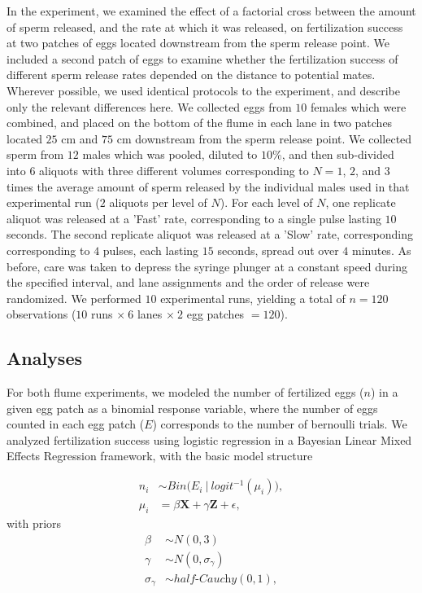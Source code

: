 \documentclass{article}
\begin{document}
	In the  experiment, we examined the effect of a factorial cross between the amount of sperm released, and the rate at which it was released, on fertilization success at two patches of eggs located downstream from the sperm release point. We included a second patch of eggs to examine whether the fertilization success of different sperm release rates depended on the distance to potential mates. Wherever possible, we used identical protocols to the  experiment, and describe only the relevant differences here. We collected eggs from $10$ females which were combined, and placed on the bottom of the flume in each lane in two patches located $25$ cm and $75$ cm downstream from the sperm release point. We collected sperm from $12$ males which was pooled, diluted to $10$\%, and then sub-divided into $6$ aliquots with three different volumes corresponding to $N = 1$, $2$, and $3$ times the average amount of sperm released by the individual males used in that experimental run ($2$ aliquots per level of $N$). For each level of $N$, one replicate aliquot was released at a 'Fast' rate, corresponding to a single pulse lasting $10$ seconds. The second replicate aliquot was released at a 'Slow' rate, corresponding corresponding to $4$ pulses, each lasting $15$ seconds, spread out over $4$ minutes. As before, care was taken to depress the syringe plunger at a constant speed during the specified interval, and lane assignments and the order of release were randomized. We performed $10$ experimental runs, yielding a total of $n=120$ observations ($10$ runs $\times~6$ lanes $\times~2$ egg patches $= 120$).

	\subsection*{Analyses}
	For both flume experiments, we modeled the number of fertilized eggs ($n$) in a given egg patch as a binomial response variable, where the number of eggs counted in each egg patch ($E$) corresponds to the number of bernoulli trials. We analyzed fertilization success using logistic regression in a Bayesian Linear Mixed Effects Regression framework, with the basic model structure 

\begin{align*}
	n_i   &\sim Bin\Big(E_i~|~logit^{-1}(\mu_i)\Big), \\
	\mu_i &= \beta \mathbf{X} + \gamma \mathbf{Z} + \epsilon,
\end{align*}
\noindent{} with priors
\begin{align*}
	\beta           &\sim N(0,3) \\
	\gamma          &\sim N(0,\sigma_{\gamma}) \\
	\sigma_{\gamma} &\sim \mathit{half} \text{-}\textit{Cauchy}(0,1),
\end{align*}
\end{document}

